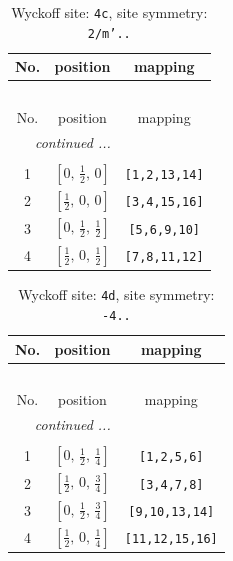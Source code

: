 \documentclass[fleqn,8pt]{jsarticle}
\begin{document}
\renewcommand{\arraystretch}{1.2}
\begin{longtable}{ccc}
\caption{Wyckoff site: {\tt 4c}, site symmetry: {\tt 2/m'..}}
 \\
 \hline \hline
No. & position & mapping \\ \hline \endfirsthead

\multicolumn{2}{l}{\tablename\ \thetable{}} \\
 \hline \hline
No. & position & mapping \\ \hline \endhead

 \hline \hline
\multicolumn{2}{r}{\footnotesize\it continued ...} \\ \endfoot

 \hline \hline
\multicolumn{2}{r}{} \\ \endlastfoot

1 & $\left[ 0,\, \frac{1}{2},\, 0 \right]$ & {\tt [1,2,13,14]} \\ \hline
2 & $\left[ \frac{1}{2},\, 0,\, 0 \right]$ & {\tt [3,4,15,16]} \\ \hline
3 & $\left[ 0,\, \frac{1}{2},\, \frac{1}{2} \right]$ & {\tt [5,6,9,10]} \\ \hline
4 & $\left[ \frac{1}{2},\, 0,\, \frac{1}{2} \right]$ & {\tt [7,8,11,12]} \\
\end{longtable}
\renewcommand{\arraystretch}{1.2}
\begin{longtable}{ccc}
\caption{Wyckoff site: {\tt 4d}, site symmetry: {\tt -4..}}
 \\
 \hline \hline
No. & position & mapping \\ \hline \endfirsthead

\multicolumn{2}{l}{\tablename\ \thetable{}} \\
 \hline \hline
No. & position & mapping \\ \hline \endhead

 \hline \hline
\multicolumn{2}{r}{\footnotesize\it continued ...} \\ \endfoot

 \hline \hline
\multicolumn{2}{r}{} \\ \endlastfoot

1 & $\left[ 0,\, \frac{1}{2},\, \frac{1}{4} \right]$ & {\tt [1,2,5,6]} \\ \hline
2 & $\left[ \frac{1}{2},\, 0,\, \frac{3}{4} \right]$ & {\tt [3,4,7,8]} \\ \hline
3 & $\left[ 0,\, \frac{1}{2},\, \frac{3}{4} \right]$ & {\tt [9,10,13,14]} \\ \hline
4 & $\left[ \frac{1}{2},\, 0,\, \frac{1}{4} \right]$ & {\tt [11,12,15,16]} \\
\end{longtable}
\end{document}
